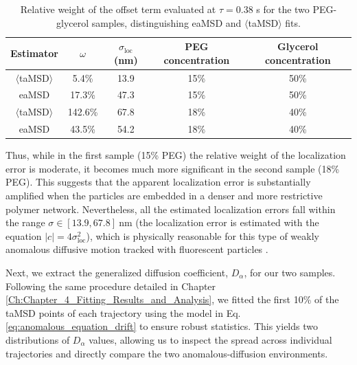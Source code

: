 \begin{table}[!htbp]
    \centering
    \caption{Relative weight of the offset term evaluated at $\tau = 0.38$ s for the two PEG-glycerol samples, distinguishing eaMSD and $\langle$taMSD$\rangle$ fits.}
    \begin{tabular}{ccccc}
        \toprule
        \textbf{Estimator} & $\omega$ & $\sigma_{\mathrm{loc}}$ (nm) & \textbf{PEG concentration} & \textbf{Glycerol concentration} \\
        \midrule
        $\langle$taMSD$\rangle$ & 5.4\% & 13.9 & 15\% & 50\% \\
        eaMSD & 17.3\% & 47.3 & 15\% & 50\% \\
        $\langle$taMSD$\rangle$ & 142.6\% & 67.8 & 18\% & 40\% \\
        eaMSD & 43.5\% & 54.2 & 18\% & 40\% \\
        \bottomrule
    \end{tabular}
    \label{tab:offset_weight_anomalous_samples}
\end{table}

Thus, while in the first sample (15\% PEG) the relative weight of the localization error is moderate, it becomes much more significant in the second sample (18\% PEG). This suggests that the apparent localization error is substantially amplified when the particles are embedded in a denser and more restrictive polymer network. Nevertheless, all the estimated localization errors fall within the range $\sigma \in [13.9, 67.8]~\mathrm{nm}$ (the localization error is estimated with the equation $|c| = 4\sigma_{\mathrm{loc}}^2$), which is physically reasonable for this type of weakly anomalous diffusive motion tracked with fluorescent particles \cite{manzo2015review}.


Next, we extract the generalized diffusion coefficient, $D_{\alpha}$, for our two samples. Following the same procedure detailed in Chapter \ref{Ch:Chapter_4_Fitting_Results_and_Analysis}, we fitted the first 10\% of the taMSD points of each trajectory using the model in Eq. \ref{eq:anomalous_equation_drift} to ensure robust statistics. This yields two distributions of $D_{\alpha}$ values, allowing us to inspect the spread across individual trajectories and directly compare the two anomalous-diffusion environments.


